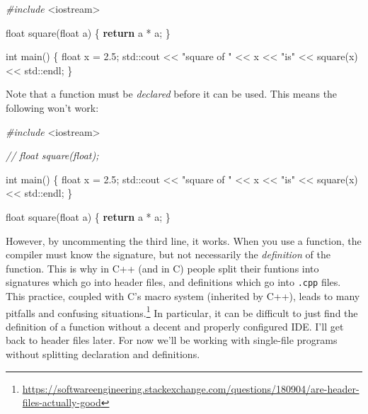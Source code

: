 \documentclass[
]{book}
\newenvironment{Shaded}{\begin{snugshade}}{\end{snugshade}}
\newcommand{\BuiltInTok}[1]{#1}
\newcommand{\CommentTok}[1]{\textcolor[rgb]{0.56,0.35,0.01}{\textit{#1}}}
\newcommand{\ControlFlowTok}[1]{\textcolor[rgb]{0.13,0.29,0.53}{\textbf{#1}}}
\newcommand{\DataTypeTok}[1]{\textcolor[rgb]{0.13,0.29,0.53}{#1}}
\newcommand{\FloatTok}[1]{\textcolor[rgb]{0.00,0.00,0.81}{#1}}
\newcommand{\ImportTok}[1]{#1}
\newcommand{\NormalTok}[1]{#1}
\newcommand{\PreprocessorTok}[1]{\textcolor[rgb]{0.56,0.35,0.01}{\textit{#1}}}
\newcommand{\StringTok}[1]{\textcolor[rgb]{0.31,0.60,0.02}{#1}}
\begin{document}
\begin{Shaded}
\begin{Highlighting}[]
\PreprocessorTok{\#include }\ImportTok{\textless{}iostream\textgreater{}}

\DataTypeTok{float}\NormalTok{ square(}\DataTypeTok{float}\NormalTok{ a)}
\NormalTok{\{}
    \ControlFlowTok{return}\NormalTok{ a * a;}
\NormalTok{\}}

\DataTypeTok{int}\NormalTok{ main()}
\NormalTok{\{}
    \DataTypeTok{float}\NormalTok{ x = }\FloatTok{2.5}\NormalTok{;}
    \BuiltInTok{std::}\NormalTok{cout \textless{}\textless{} }\StringTok{"square of "}\NormalTok{ \textless{}\textless{} x \textless{}\textless{} }\StringTok{"is"}\NormalTok{ \textless{}\textless{} square(x) \textless{}\textless{} }\BuiltInTok{std::}\NormalTok{endl;}
\NormalTok{\}}
\end{Highlighting}
\end{Shaded}

Note that a function must be \emph{declared} before it can be used. This means the following won't work:

\begin{Shaded}
\begin{Highlighting}[]
\PreprocessorTok{\#include }\ImportTok{\textless{}iostream\textgreater{}}

\CommentTok{// float square(float);}

\DataTypeTok{int}\NormalTok{ main()}
\NormalTok{\{}
    \DataTypeTok{float}\NormalTok{ x = }\FloatTok{2.5}\NormalTok{;}
    \BuiltInTok{std::}\NormalTok{cout \textless{}\textless{} }\StringTok{"square of "}\NormalTok{ \textless{}\textless{} x \textless{}\textless{} }\StringTok{"is"}\NormalTok{ \textless{}\textless{} square(x) \textless{}\textless{} }\BuiltInTok{std::}\NormalTok{endl;}
\NormalTok{\}}


\DataTypeTok{float}\NormalTok{ square(}\DataTypeTok{float}\NormalTok{ a)}
\NormalTok{\{}
    \ControlFlowTok{return}\NormalTok{ a * a;}
\NormalTok{\}}
\end{Highlighting}
\end{Shaded}

However, by uncommenting the third line, it works. When you use a function, the compiler must know the signature, but not necessarily the \emph{definition} of the function. This is why in C++ (and in C) people split their funtions into signatures which go into header files, and definitions which go into \texttt{.cpp} files. This practice, coupled with C's macro system (inherited by C++), leads to many pitfalls and confusing situations.\footnote{\url{https://softwareengineering.stackexchange.com/questions/180904/are-header-files-actually-good}} In particular, it can be difficult to just find the definition of a function without a decent and properly configured IDE. I'll get back to header files later. For now we'll be working with single-file programs without splitting declaration and definitions.
\end{document}
